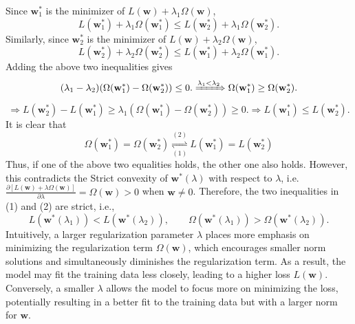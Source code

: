 \documentclass[11pt,letter,notitlepage]{article}
\begin{document}
\begin{solution}
\begin{enumerate}
	Since $\mathbf{w}_1^*$ is the minimizer of $L(\mathbf{w}) + \lambda_1 \Omega(\mathbf{w})$,
	\begin{equation}
	L(\mathbf{w}_1^*) + \lambda_1 \Omega(\mathbf{w}_1^*)
	\leq
	L(\mathbf{w}_2^*) + \lambda_1 \Omega(\mathbf{w}_2^*).
	\end{equation}
	Similarly, since $\mathbf{w}_2^*$ is the minimizer of $L(\mathbf{w}) + \lambda_2 \Omega(\mathbf{w})$,
	\begin{equation}
	L(\mathbf{w}_2^*) + \lambda_2 \Omega(\mathbf{w}_2^*)
	\leq
	L(\mathbf{w}_1^*) + \lambda_2 \Omega(\mathbf{w}_1^*).
	\end{equation}
	Adding the above two inequalities gives
	\[
	(\lambda_1 - \lambda_2)(\Omega(\mathbf{w}_1^*) - \Omega(\mathbf{w}_2^*))
	\leq
	0.
	\xRightarrow{\lambda_1 < \lambda_2}
	\Omega(\mathbf{w}_1^*) \geq \Omega(\mathbf{w}_2^*).
	\]
	\[
	\Longrightarrow
	L(\mathbf{w}_2^*) - L(\mathbf{w}_1^*)
	\geq
	\lambda_1 (\Omega(\mathbf{w}_1^*) - \Omega(\mathbf{w}_2^*))
	\geq
	0.
	\Longrightarrow
	L(\mathbf{w}_1^*) \leq L(\mathbf{w}_2^*).
	\]
	It is clear that
	\[
	\Omega(\mathbf{w}_1^*) = \Omega(\mathbf{w}_2^*)
	\underset{(1)}{\overset{(2)}{\rightleftharpoons}}
	L(\mathbf{w}_1^*) = L(\mathbf{w}_2^*)
	\]
	Thus, if one of the above two equalities holds, the other one also holds. However, this contradicts the Strict convexity of $\mathbf{w}^*(\lambda)$ with respect to $\lambda$, i.e. $\frac{\partial \left[L(\mathbf{w})+\lambda \Omega(\mathbf{w})\right]}{\partial \lambda} = \Omega(\mathbf{w}) > 0$ when $\mathbf{w} \neq 0$. Therefore, the two inequalities in (1) and (2) are strict, i.e.,
	\[
	L(\mathbf{w}^*(\lambda_1)) < L(\mathbf{w}^*(\lambda_2)),
	\qquad
	\Omega (\mathbf{w}^*(\lambda_1)) > \Omega (\mathbf{w}^*(\lambda_2)).
	\]
	Intuitively, a larger regularization parameter $\lambda$ places more emphasis on minimizing the regularization term $\Omega(\mathbf{w})$, which encourages smaller norm solutions and simultaneously diminishes the regularization term. As a result, the model may fit the training data less closely, leading to a higher loss $L(\mathbf{w})$. Conversely, a smaller $\lambda$ allows the model to focus more on minimizing the loss, potentially resulting in a better fit to the training data but with a larger norm for $\mathbf{w}$.
\end{enumerate}
\end{solution}
\end{document}
